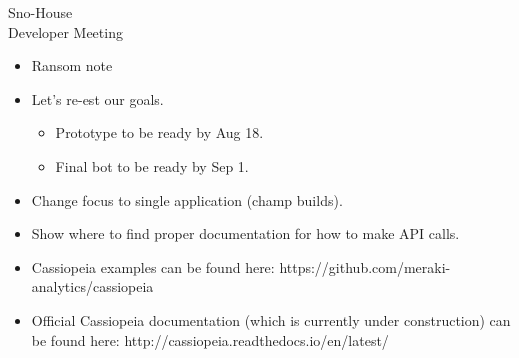 \documentclass{article}
\begin{document}
\begin{Minutes}{Sno-House\\Developer Meeting}






\maketitle

\begin{itemize}
	\item Ransom note
\end{itemize}

\begin{itemize}
	\item Let's re-est our goals.
	\begin{itemize}
		\item Prototype to be ready by Aug 18.
		\item Final bot to be ready by Sep 1.
	\end{itemize}
	\item Change focus to single application (champ builds).
\end{itemize}

\begin{itemize}
	\item Show where to find proper documentation for how to make API calls.
	\item Cassiopeia examples can be found here: {https://github.com/meraki-analytics/cassiopeia}
	\item Official Cassiopeia documentation (which is currently under construction) can be found here: {http://cassiopeia.readthedocs.io/en/latest/}
\end{itemize}


\thispagestyle{creditfooter}

\end{Minutes}
\end{document}
